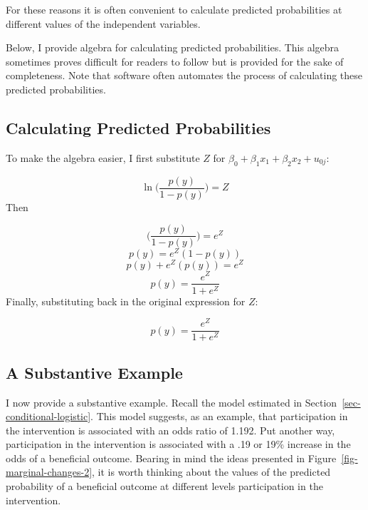 \documentclass[
  letterpaper,
  DIV=11,
  numbers=noendperiod]{scrreprt}
\begin{document}
For these reasons it is often convenient to calculate predicted
probabilities at different values of the independent variables.

\begin{tcolorbox}[enhanced jigsaw, coltitle=black, left=2mm, toprule=.15mm, arc=.35mm, colframe=quarto-callout-tip-color-frame, colback=white, bottomrule=.15mm, breakable, leftrule=.75mm, toptitle=1mm, titlerule=0mm, bottomtitle=1mm, title=\textcolor{quarto-callout-tip-color}{\faLightbulb}\hspace{0.5em}{The Algebra May Be Helpful}, rightrule=.15mm, opacitybacktitle=0.6, opacityback=0, colbacktitle=quarto-callout-tip-color!10!white]

Below, I provide algebra for calculating predicted probabilities. This
algebra sometimes proves difficult for readers to follow but is provided
for the sake of completeness. Note that software often automates the
process of calculating these predicted probabilities.

\end{tcolorbox}

\subsection{Calculating Predicted
Probabilities}\label{calculating-predicted-probabilities}

To make the algebra easier, I first substitute \(Z\) for
\(\beta_0 + \beta_1 x_1 + \beta_2 x_2 + u_{0j}\):

\[\ln\Big(\frac{p(y)}{1-p(y)}\Big) = Z\] Then

\[\Big(\frac{p(y)}{1-p(y)}\Big) = e^Z\] \[p(y) = e^Z(1-p(y))\]
\[p(y) + e^Z(p(y)) = e^Z\] \[p(y) = \frac{e^Z}{1+e^Z}\] Finally,
substituting back in the original expression for \(Z\):

\[p(y) = \frac{e^Z}{1+e^Z}\]

\subsection{A Substantive Example}\label{a-substantive-example}

I now provide a substantive example. Recall the model estimated in
Section~\ref{sec-conditional-logistic}. This model suggests, as an
example, that participation in the intervention is associated with an
odds ratio of 1.192. Put another way, participation in the intervention
is associated with a .19 or 19\% increase in the odds of a beneficial
outcome. Bearing in mind the ideas presented in
Figure~\ref{fig-marginal-changes-2}, it is worth thinking about the
values of the predicted probability of a beneficial outcome at different
levels participation in the intervention.
\end{document}
